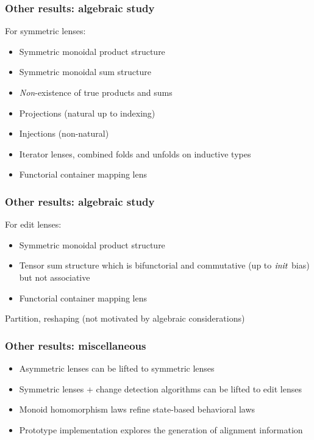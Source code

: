 \documentclass[table]{beamer}
\begin{document}
\begin{frame}
    \frametitle{Other results: algebraic study}
    For symmetric lenses:
    \begin{itemize}
        \item Symmetric monoidal product structure
        \item Symmetric monoidal sum structure
        \item \emph{Non}-existence of true products and sums
        \item Projections (natural up to indexing)
        \item Injections (non-natural)
        \item Iterator lenses, combined folds and unfolds on inductive types
        \item Functorial container mapping lens
    \end{itemize}
\end{frame}

\begin{frame}
    \frametitle{Other results: algebraic study}
    For edit lenses:
    \begin{itemize}
        \item Symmetric monoidal product structure
        \item Tensor sum structure which is bifunctorial and commutative (up
            to $\mathit{init}$ bias) but not associative
        \item Functorial container mapping lens
    \end{itemize}
    Partition, reshaping (not motivated by algebraic considerations)
\end{frame}

\begin{frame}
    \frametitle{Other results: miscellaneous}
    \begin{itemize}
        \item Asymmetric lenses can be lifted to symmetric lenses
        \item Symmetric lenses + change detection algorithms can be lifted
            to edit lenses
        \item Monoid homomorphism laws refine state-based behavioral laws
        \item Prototype implementation explores the generation of alignment
            information
    \end{itemize}
\end{frame}
\end{document}
